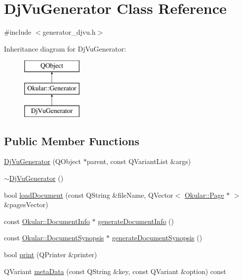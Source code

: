 \hypertarget{classDjVuGenerator}{\section{Dj\+Vu\+Generator Class Reference}
\label{classDjVuGenerator}
}


{\ttfamily \#include $<$generator\+\_\+djvu.\+h$>$}

Inheritance diagram for Dj\+Vu\+Generator\+:\begin{figure}[H]
\begin{center}
\leavevmode
\includegraphics[height=3.000000cm]{classDjVuGenerator}
\end{center}
\end{figure}
\subsection*{Public Member Functions}
\begin{DoxyCompactItemize}
\item 
\hyperlink{classDjVuGenerator_a1afc4e3ef24772d6e7c53d71a7d85b59}{Dj\+Vu\+Generator} (Q\+Object $\ast$parent, const Q\+Variant\+List \&args)
\item 
\hyperlink{classDjVuGenerator_ac4ca23827a811606c09eaaac001e5a73}{$\sim$\+Dj\+Vu\+Generator} ()
\item 
bool \hyperlink{classDjVuGenerator_ace33eff68f72609689d7850b0ef3e6ef}{load\+Document} (const Q\+String \&file\+Name, Q\+Vector$<$ \hyperlink{classOkular_1_1Page}{Okular\+::\+Page} $\ast$ $>$ \&pages\+Vector)
\item 
const \hyperlink{classOkular_1_1DocumentInfo}{Okular\+::\+Document\+Info} $\ast$ \hyperlink{classDjVuGenerator_acf9234f6d7b9d33c6306b6d0e11464a0}{generate\+Document\+Info} ()
\item 
const \hyperlink{classOkular_1_1DocumentSynopsis}{Okular\+::\+Document\+Synopsis} $\ast$ \hyperlink{classDjVuGenerator_acc8cf4d02a9dcc84880ccc9cba988345}{generate\+Document\+Synopsis} ()
\item 
bool \hyperlink{classDjVuGenerator_a8127027939e0f71b0b15b28794863dd5}{print} (Q\+Printer \&printer)
\item 
Q\+Variant \hyperlink{classDjVuGenerator_a354dc9b90acf89f0a83dfcd92429bfdb}{meta\+Data} (const Q\+String \&key, const Q\+Variant \&option) const 
\end{DoxyCompactItemize}

